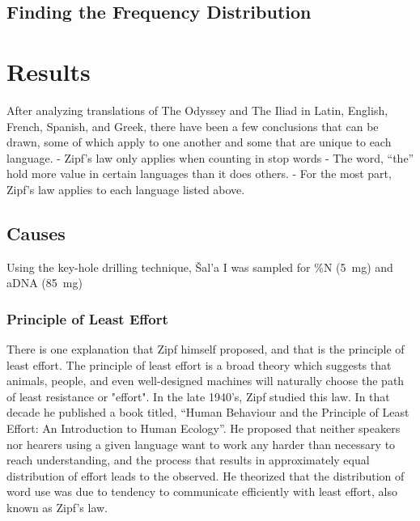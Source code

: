 \documentclass[a4paper,10pt]{article}
\begin{document}
\subsection{Finding the Frequency Distribution}

\section{Results}

After analyzing translations of The Odyssey and The Iliad in Latin, English, French, Spanish, and Greek, there have been a few conclusions that can be drawn, some of which apply to one another and some that are unique to each language.
- Zipf’s law only applies when counting in stop words
- The word, “the” hold more value in certain languages than it does others.
- For the most part, Zipf’s law applies to each language listed above.



\subsection{Causes}

Using the key-hole drilling technique, Šal'a I was sampled for \%N (5~mg) and aDNA (85~mg)


\subsubsection{Principle of Least Effort}

There is one explanation that Zipf himself proposed, and that is the principle of least effort. The principle of least effort is a broad theory which suggests that animals, people, and even well-designed machines will naturally choose the path of least resistance or "effort". In the late 1940’s, Zipf studied this law. In that decade he published a book titled, “Human Behaviour and the Principle of Least Effort: An Introduction to Human Ecology”. He proposed that neither speakers nor hearers using a given language want to work any harder than necessary to reach understanding, and the process that results in approximately equal distribution of effort leads to the observed. He theorized that the distribution of word use was due to tendency to communicate efficiently with least effort, also known as Zipf’s law.
\end{document}
